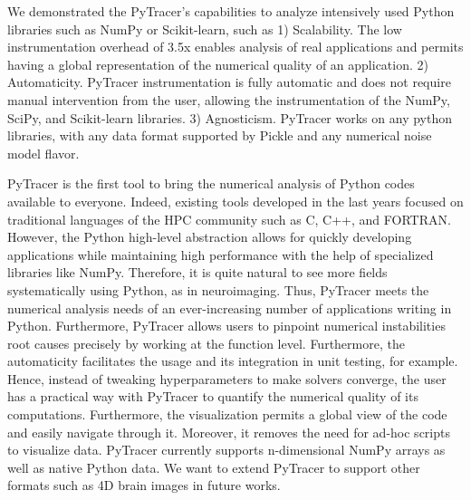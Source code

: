 \documentclass[11pt]{article}
\newcommand{\pytracer}[0]{PyTracer\xspace}
\begin{document}
We demonstrated the \pytracer's capabilities to analyze intensively used Python libraries such as NumPy or Scikit-learn, such as 1) Scalability. The low instrumentation overhead of 3.5x enables analysis of real applications and permits having a global representation of the numerical quality of an application. 2) Automaticity. \pytracer instrumentation is fully automatic and does not require manual intervention from the user, allowing the instrumentation of the NumPy, SciPy, and Scikit-learn libraries.
3) Agnosticism. \pytracer works on any python libraries, with any data format supported by Pickle and any numerical noise model flavor.

\pytracer is the first tool to bring the numerical analysis of Python codes available to everyone. Indeed, existing tools developed in the last years focused on traditional languages of the HPC community such as C, C++, and FORTRAN. However, the Python high-level abstraction allows for quickly developing applications while maintaining high performance with the help of specialized libraries like NumPy. Therefore, it is quite natural to see more fields systematically using Python, as in neuroimaging. Thus, \pytracer meets the numerical analysis needs of an ever-increasing number of applications writing in Python.
Furthermore, \pytracer allows users to pinpoint numerical instabilities root causes precisely by working at the function level. Furthermore, the automaticity facilitates the usage and its integration in unit testing, for example. Hence, instead of tweaking hyperparameters to make solvers converge, the user has a practical way with \pytracer to quantify the numerical quality of its computations. Furthermore, the visualization permits a global view of the code and easily navigate through it.
Moreover, it removes the need for ad-hoc scripts to visualize data. \pytracer currently supports n-dimensional NumPy arrays as well as native Python data. We want to extend \pytracer to support other formats such as 4D brain images in future works.
\end{document}
